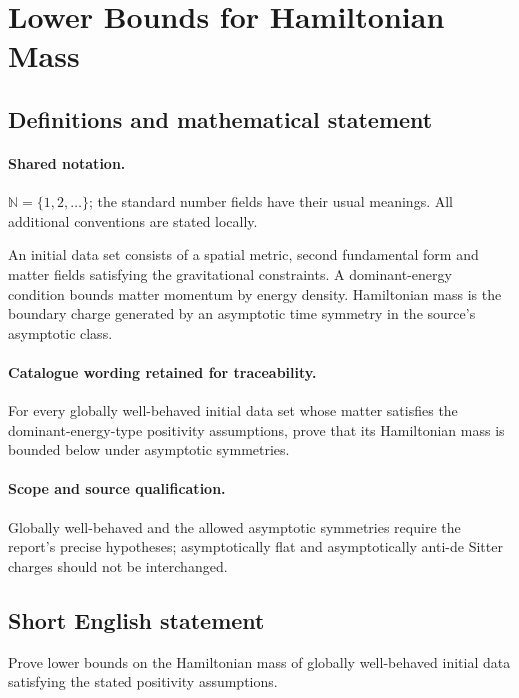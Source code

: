 \documentclass[11pt]{article}
\begin{document}
\section{Lower Bounds for Hamiltonian Mass}\label{statement}

\subsection{Definitions and mathematical statement}

\paragraph{Shared notation.}$\mathbb N=\{1,2,\ldots\}$; the standard number fields have their usual meanings. All additional conventions are stated locally.


An initial data set consists of a spatial metric, second fundamental form and matter fields satisfying the gravitational constraints. A dominant-energy condition bounds matter momentum by energy density. Hamiltonian mass is the boundary charge generated by an asymptotic time symmetry in the source's asymptotic class.

\paragraph{Catalogue wording retained for traceability.}
For every globally well-behaved initial data set whose matter satisfies the dominant-energy-type positivity assumptions, prove that its Hamiltonian mass is bounded below under asymptotic symmetries.

\paragraph{Scope and source qualification.}Globally well-behaved and the allowed asymptotic symmetries require the report's precise hypotheses; asymptotically flat and asymptotically anti-de Sitter charges should not be interchanged.
\subsection{Short English statement}
Prove lower bounds on the Hamiltonian mass of globally well-behaved initial data satisfying the stated positivity assumptions.
\end{document}
